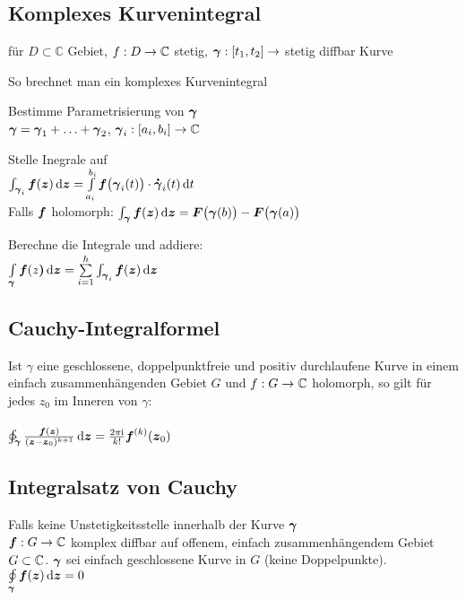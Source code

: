 \documentclass[german,color,5pt]{latex4ei/latex4ei_fs}
\begin{document}
\begin{sectionbox}
	\subsection{Komplexes Kurvenintegral}
	für $D \subset \mathbb C$ Gebiet, $f: D \rightarrow \mathbb C$ stetig, $\boldsymbol{\gamma}: [t_1, t_2] \rightarrow $ stetig diffbar Kurve
	\begin{cookbox}{So brechnet man ein komplexes Kurvenintegral}
		\item Bestimme Parametrisierung von $\boldsymbol{\gamma}$ \\
		$\boldsymbol{\gamma} = \boldsymbol{\gamma}_1 + \ldots + \boldsymbol{\gamma}_2$, $\boldsymbol{\gamma}_i : [a_i, b_i] \rightarrow \mathbb C$
		\item Stelle Inegrale auf \\
		$\int_{\cx \gamma_i} \cx f(\cx z) \diff \cx z = \int \limits_{a_i}^{b_i} \cx f\big(\cx \gamma_i(t)\big) \cdot \dot{\cx \gamma}_i (t) \diff t$\\
		Falls $\boldsymbol{f}$ holomorph: $\int_{\cx \gamma} \cx f(\cx z) \diff \cx z = \cx F\big(\cx \gamma(b)\big) - \cx F\big(\cx \gamma(a)\big)$
		\item Berechne die Integrale und addiere: \\
		$\int \limits_{\cx \gamma} \cx f(z\cx ) \diff \cx z = \sum \limits_{i = 1}^{h} \int_{\cx \gamma_i} \cx f(\cx z) \diff \cx z$
	\end{cookbox}
\end{sectionbox}

\begin{sectionbox}
	\subsection{Cauchy-Integralformel}
	Ist $\gamma$ eine geschlossene, doppelpunktfreie und positiv durchlaufene Kurve in einem einfach zusammenhängenden Gebiet $G$ und $f : G \rightarrow \mathbb{C}$ holomorph, so gilt für jedes $z_0$ im Inneren von $\gamma$: \\
	\\
	$\ointctrclockwise_{\cx \gamma} \frac{\cx f(\cx z)}{(\cx z - \cx z_0)^{k+1}} \diff \cx z = \frac{2\pi \i}{k!} \cx f^{(k)}(\cx z_0) $ 
\end{sectionbox}

\begin{sectionbox}
	\subsection{Integralsatz von Cauchy}
	Falls keine Unstetigkeitsstelle innerhalb der Kurve $\boldsymbol{\gamma}$\\ 
	$\boldsymbol{f}: G \rightarrow \mathbb C$ komplex diffbar auf offenem, einfach zusammenhängendem Gebiet $G \subset \mathbb C$. $\boldsymbol{\gamma}$ sei einfach geschlossene Kurve in $G$ (keine Doppelpunkte). \\
	$\oint \limits_{\cx \gamma} \cx f(\cx z) \diff \cx z = 0$
\end{sectionbox}
\end{document}
